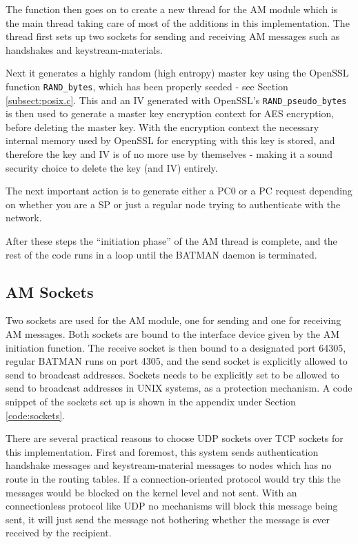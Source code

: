 The function then goes on to create a new thread for the AM module which is the
main thread taking care of most of the additions in this implementation. The
thread first sets up two sockets for sending and receiving AM messages such as
handshakes and keystream-materials.

Next it generates a highly random (high entropy) master key using the OpenSSL
function \texttt{RAND\_bytes}, which has been properly seeded - see Section
\ref{subsect:posix.c}. This and an IV generated with OpenSSL's
\texttt{RAND\_pseudo\_bytes} is then used to generate a master key encryption
context for AES encryption, before deleting the master key. With the encryption
context the necessary internal memory used by OpenSSL for encrypting with this
key is stored, and therefore the key and IV is of no more use by themselves -
making it a sound security choice to delete the key (and IV) entirely.

The next important action is to generate either a \ac{PC0} or a \ac{PC} request
depending on whether you are a \ac{SP} or just a regular node trying to
authenticate with the network.

After these steps the ``initiation phase'' of the AM thread is complete, and the
rest of the code runs in a loop until the BATMAN daemon is terminated.

\subsection{AM Sockets}\label{subsect:am_socks}
Two sockets are used for the AM module, one for sending and one for receiving AM
messages. Both sockets are bound to the interface device given by the AM
initiation function. The receive socket is then bound to a designated port
64305, regular BATMAN runs on port 4305, and the send socket is explicitly
allowed to send to broadcast addresses. Sockets needs to be explicitly set to be
allowed to send to broadcast addresses in UNIX systems, as a protection
mechanism. A code snippet of the sockets set up is shown in the appendix under
Section \ref{code:sockets}.

There are several practical reasons to choose UDP sockets over TCP sockets for
this implementation. First and foremost, this system sends authentication
handshake messages and keystream-material messages to nodes which has no route
in the routing tables. If a connection-oriented protocol would try this the
messages would be blocked on the kernel level and not sent. With an
connectionless protocol like UDP no mechanisms will block this message being
sent, it will just send the message not bothering whether the message is ever
received by the recipient.

